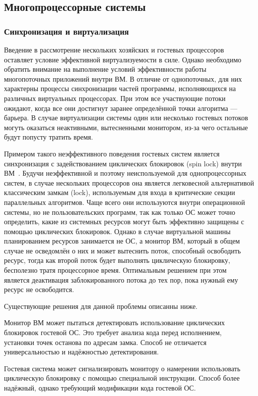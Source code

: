 \subsection{Многопроцессорные системы}

\subsubsection{Синхронизация и виртуализация}

Введение в рассмотрение нескольких хозяйских и гостевых процессоров оставляет условие эффективной виртуализуемости в силе. Однако необходимо обратить внимание на выполнение условий эффективности работы многопоточных приложений внутри ВМ. В отличие от однопоточных, для них характерны процессы синхронизации частей программы, исполняющихся на различных виртуальных процессорах. При этом все участвующие потоки ожидают, когда все они достигнут заранее определённой точки алгоритма --- барьера. В случае виртуализации системы один или несколько гостевых потоков могуть оказаться неактивными, вытесненными монитором, из-за чего остальные будут попусту тратить время.

Примером такого неэффективного поведения гостевых систем является синхронизация с задействованием циклических блокировок (\abbr spin lock) внутри ВМ~\cite{southern-v12n}. Будучи неэффективной и поэтому неиспользуемой для однопроцессорных систем, в случае нескольких процессоров она является легковесной альтернативой классическим замкам (\abbr lock), используемым для входа в критические секции параллельных алгоритмов. Чаще всего они используются внутри операционной системы, но не пользовательских программ, так как только ОС может точно определить, какие из системных ресурсов могут быть эффективно защищены с помощью циклических блокировок. Однако в случае виртуальной машины планированием ресурсов занимается не ОС, а монитор ВМ, который в общем случае не осведомлён о них и может вытеснить поток, способный освободить ресурс, тогда как второй поток будет выполнять циклическую блокировку, бесполезно тратя процессорное время. Оптимальным решением при этом является деактивация заблокированного потока до тех пор, пока нужный ему ресурс не освободится.

Существующие решения для данной проблемы описанны ниже.

\begin{enumerate*}
    \item Монитор ВМ может пытаться детектировать использование циклических блокировок гостевой ОС. Это требует анализа кода перед исполнением, установки точек останова по адресам замка. Способ не отличается универсальностью и надёжностью детектирования.
    \item Гостевая система может сигнализировать монитору о намерении использовать циклическую блокировку с помощью специальной инструкции. Способ более надёжный, однако требующий модификации кода гостевой ОС.
\end{enumerate*}


